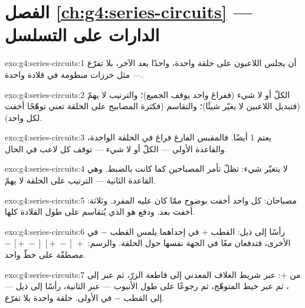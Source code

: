 \section*{الفصل \ref{ch:g4:series-circuits} --- الدارات على التسلسل}

\begin{solution}{exo:g4:series-circuits:1}
أن يجلس اللاعبون على حلقة واحدة، واحدًا بعد الآخر، بلا تفرّع
--- مثل خرزات منظومة في قلادة واحدة.
\end{solution}

\begin{solution}{exo:g4:series-circuits:2}
الكلّ أو لا شيء (ففراغ واحد يوقف الجميع)؛ والترتيب لا يهمّ
(فتبديل اللاعبين لا يغيّر شيئًا)؛ والتقاسم (فكثرة المصابيح على
الحلقة تعني توهّجًا أخفت لكل واحد).
\end{solution}

\begin{solution}{exo:g4:series-circuits:3}
يعتم  1 أيضًا. فالمقبس الفارغ فراغ في الحلقة الواحدة،
والقاعدة الأولى --- الكلّ أو لا شيء --- توقف كل لاعب في الحال.
\end{solution}

\begin{solution}{exo:g4:series-circuits:4}
لا يتغيّر شيء:  تظلّ تأمر المصباحين كما كانت بالضبط.
وهي القاعدة الثانية --- الترتيب على الحلقة لا يهمّ.
\end{solution}

\begin{solution}{exo:g4:series-circuits:5}
مصباحان: كل واحد أخفت بوضوح ممّا كان عليه  المفرد.
وثلاثة: أخفت بعد. ودفع  هو الذي يُتقاسم على طول القلادة
كلها.
\end{solution}

\begin{solution}{exo:g4:series-circuits:6}
رأسًا إلى ذيل: القطب $+$ في إحداهما يلمس القطب $-$ في الأخرى،
فتدفعان معًا في الجهة نفسها حول الحلقة. والرسم:
$-\,[{+}\;{-}]\,[{+}\;{-}]\,+$ مصطفّة على خطّ واحد.
\end{solution}

\begin{solution}{exo:g4:series-circuits:7}
من $+$: عبر شريط الغلاف المعدني إلى قاطعة الزرّ، ثم عبر 
إلى ، ثم عبر خيط  المتوهّج، ثم رجوعًا على طول
الأنبوب --- عبر  الثانية، رأسًا إلى ذيل --- إلى القطب
$-$ في  الأولى. حلقة واحدة بلا تفرّع.
\end{solution}

